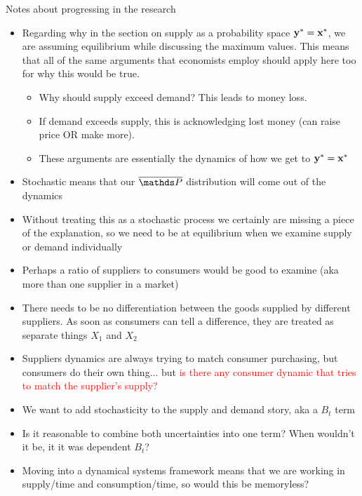 Notes about progressing in the research
\begin{itemize}
	\item Regarding why in the section on supply as a probability space $\mathbf{y}^* = \mathbf{x}^*$, we are assuming equilibrium while discussing the maximum values. This means that all of the same arguments that economists employ should apply here too for why this would be true. %
	\begin{itemize}
		\item Why should supply exceed demand? This leads to money loss.
		\item If demand exceeds supply, this is acknowledging lost money (can raise price OR make more).
		\item These arguments are essentially the dynamics of how we get to $\mathbf{y}^* =\mathbf{x}^*$ 
	\end{itemize}
	\item Stochastic means that our $\Pbb$ distribution will come out of the dynamics
	\item Without treating this as a stochastic process we certainly are missing a piece of the explanation, so we need to be at equilibrium when we examine supply or demand individually
	\item Perhaps a ratio of suppliers to consumers would be good to examine (aka more than one supplier in a market)
	\item There needs to be no differentiation between the goods supplied by different suppliers. As soon as consumers can tell a difference, they are treated as separate things $X_1$ and $X_2$
	\item Suppliers dynamics are always trying to match consumer purchasing, but consumers do their own thing... but \textcolor{red}{is there any consumer dynamic that tries to match the supplier's supply?}
	\item We want to add stochasticity to the supply and demand story, aka a $B_t$ term
	\item Is it reasonable to combine both uncertainties into one term? When wouldn't it be, it it was dependent $B_t$? 
	\item Moving into a dynamical systems framework means that we are working in supply/time and consumption/time, so would this be memoryless?
\end{itemize}


